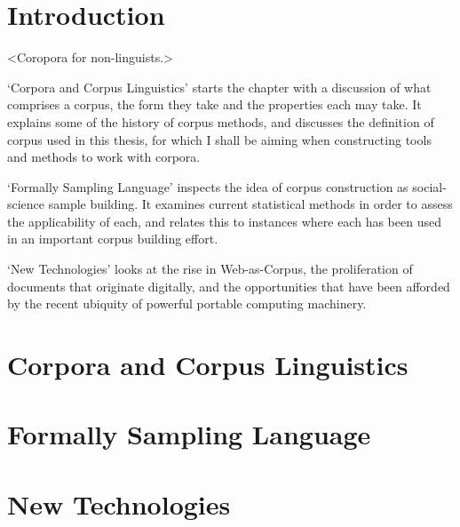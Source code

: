 \section{Introduction}
<Coropora for non-linguists.>



`Corpora and Corpus Linguistics' starts the chapter with a discussion of what comprises a corpus, the form they take and the properties each may take.  It explains some of the history of corpus methods, and discusses the definition of corpus used in this thesis, for which I shall be aiming when constructing tools and methods to work with corpora.

`Formally Sampling Language' inspects the idea of corpus construction as social-science sample building.  It examines current statistical methods in order to assess the applicability of each, and relates this to instances where each has been used in an important corpus building effort.

`New Technologies' looks at the rise in Web-as-Corpus, the proliferation of documents that originate digitally, and the opportunities that have been afforded by the recent ubiquity of powerful portable computing machinery.




\section{Corpora and Corpus Linguistics}
\label{sec:litreview-corpora}




\section{Formally Sampling Language}
\label{sec:litreview-sampling}




\section{New Technologies} %
\label{sec:litreview-newtech}


